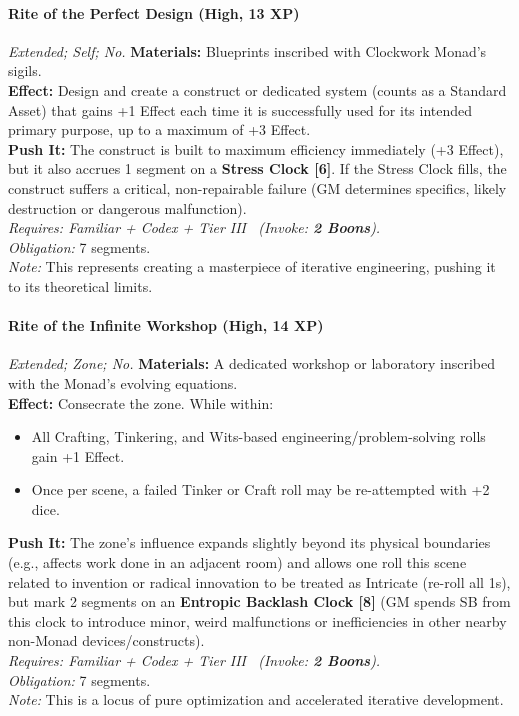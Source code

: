 \paragraph{Rite of the Perfect Design (High, 13 XP)} \emph{Extended; Self; No.}
\textbf{Materials:} Blueprints inscribed with Clockwork Monad's sigils. \\
\textbf{Effect:} Design and create a construct or dedicated system (counts as a Standard Asset) that gains +1 Effect each time it is successfully used for its intended primary purpose, up to a maximum of +3 Effect. \\
\textbf{Push It:} The construct is built to maximum efficiency immediately (+3 Effect), but it also accrues 1 segment on a \textbf{Stress Clock [6]}. If the Stress Clock fills, the construct suffers a critical, non-repairable failure (GM determines specifics, likely destruction or dangerous malfunction). \\
\emph{Requires: Familiar + Codex + Tier III \ (\textit{Invoke:} \textbf{2 Boons}).} \\
\emph{Obligation:} 7 segments. \\
\emph{Note:} This represents creating a masterpiece of iterative engineering, pushing it to its theoretical limits.

\paragraph{Rite of the Infinite Workshop (High, 14 XP)} \emph{Extended; Zone; No.}
\textbf{Materials:} A dedicated workshop or laboratory inscribed with the Monad's evolving equations. \\
\textbf{Effect:} Consecrate the zone. While within:
\begin{itemize}
    \item All Crafting, Tinkering, and Wits-based engineering/problem-solving rolls gain +1 Effect.
    \item Once per scene, a failed Tinker or Craft roll may be re-attempted with +2 dice.
\end{itemize}
\textbf{Push It:} The zone's influence expands slightly beyond its physical boundaries (e.g., affects work done in an adjacent room) and allows one roll this scene related to invention or radical innovation to be treated as Intricate (re-roll all 1s), but mark 2 segments on an \textbf{Entropic Backlash Clock [8]} (GM spends SB from this clock to introduce minor, weird malfunctions or inefficiencies in other nearby non-Monad devices/constructs). \\
\emph{Requires: Familiar + Codex + Tier III \ (\textit{Invoke:} \textbf{2 Boons}).} \\
\emph{Obligation:} 7 segments. \\
\emph{Note:} This is a locus of pure optimization and accelerated iterative development.
